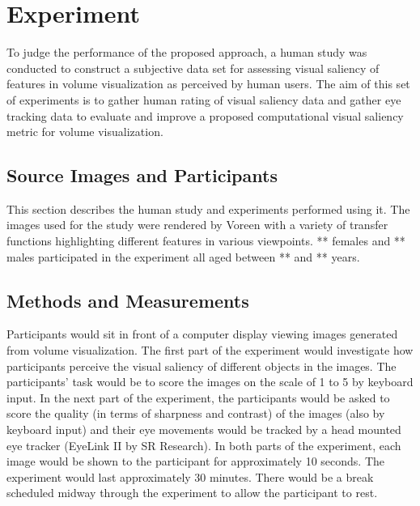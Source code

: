 \section{Experiment}
To judge the performance of the proposed approach, a human study was conducted to construct a subjective data set for assessing visual saliency of features in volume visualization as perceived by human users. The aim of this set of experiments is to gather human rating of visual saliency data and gather eye tracking data to evaluate and improve a proposed computational visual saliency metric for volume visualization.

\subsection{Source Images and Participants}
This section describes the human study and experiments performed using it.
The images used for the study were rendered by Voreen \cite{meyer-spradow_voreen:_2009} with a variety of transfer functions highlighting different features in various viewpoints.
** females and ** males participated in the experiment all aged between ** and ** years.

\subsection{Methods and Measurements}
Participants would sit in front of a computer display viewing images generated from volume visualization. The first part of the experiment would investigate how participants perceive the visual saliency of different objects in the images. The participants’ task would be to score the images on the scale of 1 to 5 by keyboard input. In the next part of the experiment, the participants would be asked to score the quality (in terms of sharpness and contrast) of the images (also by keyboard input) and their eye movements would be tracked by a head mounted eye tracker (EyeLink II by SR Research). In both parts of the experiment, each image would be shown to the participant for approximately 10 seconds. The experiment would last approximately 30 minutes. There would be a break scheduled midway through the experiment to allow the participant to rest.

